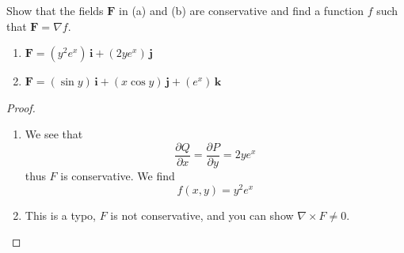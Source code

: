 \documentclass[openany]{book}
\begin{document}
\begin{prob}[12]
    Show that the fields \( \mathbf{F} \) in (a) and (b) are conservative and find a function \( f \) such that \( \mathbf{F} = \nabla f \).  

    \begin{enumerate}
        \item[(a)] \( \mathbf{F} = (y^2 e^x) \, \mathbf{i} + (2y e^x) \, \mathbf{j} \)
        \item[(b)] \( \mathbf{F} = (\sin y) \, \mathbf{i} + (x \cos y) \, \mathbf{j} + (e^x) \, \mathbf{k} \)
    \end{enumerate}
\end{prob}
\begin{proof}
    \begin{enumerate}
        \item[(a)] We see that 
        \begin{equation*}
            \frac{\partial Q}{\partial x}=\frac{\partial P}{\partial y}=2ye^x
        \end{equation*}
        thus $F$ is conservative. We find 
        \begin{equation*}
            f(x,y)=y^2e^x
        \end{equation*}
        \item[(b)] This is a typo, $F$ is not conservative, and you can show $\nabla\times F\neq 0$.
    \end{enumerate}
\end{proof}
\end{document}
